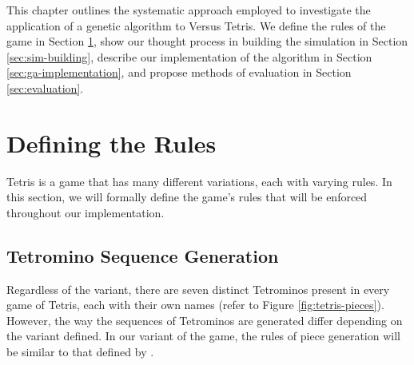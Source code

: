 \documentclass[a4paper, 12pt]{extreport}
\begin{document}
	This chapter outlines the systematic approach employed to investigate the application of a genetic algorithm to Versus Tetris. We define the rules of the game in Section \ref{sec:rules}, show our thought process in building the simulation in Section \ref{sec:sim-building}, describe our implementation of the algorithm in Section \ref{sec:ga-implementation}, and propose methods of evaluation in Section \ref{sec:evaluation}.
	
	\section{Defining the Rules}\label{sec:rules}
	Tetris is a game that has many different variations, each with varying rules. In this section, we will formally define the game's rules that will be enforced throughout our implementation.
	
	\subsection{Tetromino Sequence Generation}\label{subsec:tet-generation}
	
	Regardless of the variant, there are seven distinct Tetrominos present in every game of Tetris, each with their own names (refer to Figure \ref{fig:tetris-pieces}). However, the way the sequences of Tetrominos are generated differ depending on the variant defined. In our variant of the game, the rules of piece generation will be similar to that defined by \citeauthor{tetris-drl-2} \cite{tetris-drl-2}.
	
\end{document}
